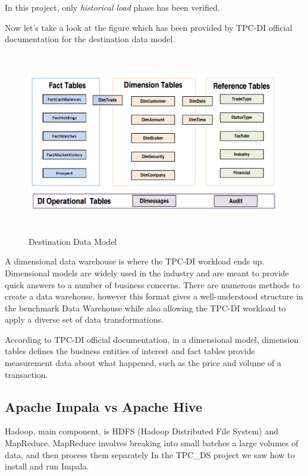 \documentclass{article}
\newcommand\ita[1]{\textit{#1}}
\begin{document}
In this project, only \ita{historical load} phase has been verified.

Now let's take a look at the figure which has been provided by TPC-DI official documentation for the destination data model.

\begin{figure}[H] 
\begin{center}
\includegraphics[width=15cm, height=8cm]{images2/destmodel.png}
\end{center}
\caption{Destination Data Model}
\label{dstmdl}
\end{figure} 

A dimensional data warehouse is where the TPC-DI workload ends up. Dimensional models are widely used in the industry and are meant to provide quick answers to a number of business concerns. There are numerous methods to create a data warehouse, however this format gives a well-understood structure in the benchmark Data Warehouse while also allowing the TPC-DI workload to apply a diverse set of data transformations. 

According to TPC-DI official documentation, in a dimensional model, dimension tables defines the business entities of interest and fact tables provide measurement data about what happened, such as the price and volume of a transaction. 

\subsection{Apache Impala vs Apache Hive}
Hadoop, main component, is HDFS (Hadoop Distributed File System) and MapReduce. MapReduce involves breaking into small batches a large volumes of data, and then process them separately
In the TPC\_DS project we saw how to install and run Impala.
\end{document}
